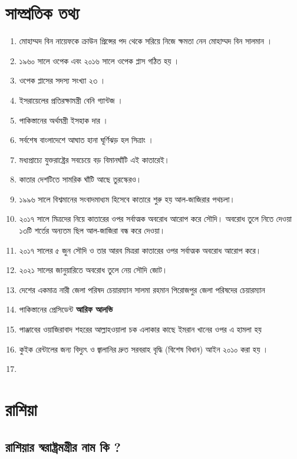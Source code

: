 \documentclass[11pt]{article}
\author{Space-X}
\date{\today}
\title{}
\begin{document}
\tableofcontents

\section{সাম্প্রতিক তথ্য}
\label{sec:org7639eff}

\begin{enumerate}
\item মোহাম্মদ বিন নায়েফকে ক্রাউন প্রিন্সের পদ থেকে সরিয়ে নিজে ক্ষমতা নেন মোহাম্মদ বিন সালমান ।
\item ১৯৬০ সালে ওপেক এবং ২০১৬ সালে ওপেক প্লাস গঠিত হয় ।
\item ওপেক প্লাসের সদস্য সংখ্যা ২৩ ।
\item ইসরায়েলের প্রতিরক্ষামন্ত্রী বেনি গ্যান্টজ ।
\item পাকিস্তানের অর্থমন্ত্রী ইসহাক দার  ।
\item সর্বশেষ বাংলাদেশে  আঘাত হানা ঘূর্ণিঝড় হল  সিত্রাং ।
\item মধ্যপ্রাচ্যে যুক্তরাষ্ট্রের সবচেয়ে বড় বিমানঘাঁটি এই কাতারেই।
\item কাতার দেশটিতে সামরিক ঘাঁটি আছে তুরস্কেরও।
\item ১৯৯৬ সালে বিশ্বমানের সংবাদমাধ্যম হিসেবে কাতারে শুরু হয় আল-জাজিরার পথচলা।
\item ২০১৭ সালে মিত্রদের নিয়ে কাতারের ওপর সর্বাত্মক অবরোধ আরোপ করে সৌদি। অবরোধ তুলে নিতে দেওয়া ১৩টি শর্তের অন্যতম ছিল আল-জাজিরা বন্ধ করে দেওয়া।
\item ২০১৭ সালের ৫ জুন সৌদি ও তার আরব মিত্ররা কাতারের ওপর সর্বাত্মক অবরোধ আরোপ করে।
\item ২০২১ সালের জানুয়ারিতে অবরোধ তুলে নেয় সৌদি জোট।
\item দেশের একমাত্র নারী জেলা পরিষদ চেয়ারম্যান সালমা রহমান পিরোজপুর জেলা পরিষদের চেয়ারম্যান
\item পাকিস্তানের প্রেসিডেন্ট \textbf{আরিফ আলভি}
\item পাঞ্জাবের ওয়াজিরাবাদ শহরের আল্লাহওয়ালা চক এলাকার কাছে ইমরান খানের ওপর এ হামলা হয়
\item কুইক রেন্টালের জন্য বিদ্যুৎ ও জ্বালানির দ্রুত সরবরাহ বৃদ্ধি (বিশেষ বিধান) আইন ২০১০ করা হয় ।
\item 
\end{enumerate}



\section{রাশিয়া}
\label{sec:org395506a}
\subsection{রাশিয়ার স্বরাষ্ট্রমন্ত্রীর নাম কি ?}
\label{sec:org15390d3}
\end{document}
